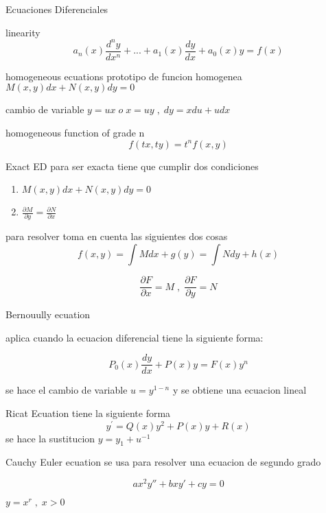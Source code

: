 \begin{section}{Ecuaciones Diferenciales}
	\begin{subsection}{linearity}
		$$ a_n(x) \frac{d^ny}{dx^n} + ... +  a_1(x) \frac{dy}{dx} + a_0(x)y = f(x)$$ 
	\end{subsection}
	\begin{subsection}{homogeneous ecuations}
		prototipo de funcion homogenea $M(x,y)dx + N(x,y)dy = 0$ 

		cambio de variable $y=ux \; o \; x=uy \; , \; dy=xdu + udx $
	
	\end{subsection}
	\begin{subsection}{homogeneous function of grade n}
		$$f(tx,ty) = t^nf(x,y)$$
	
	\end{subsection}
	\begin{subsection}{Exact ED}
		para ser exacta tiene que cumplir dos condiciones 
	\begin{enumerate}
		\item $M(x,y)dx + N(x,y)dy = 0$
		\item $\frac{\partial M}{\partial y} = \frac{\partial N }{\partial x}$
	\end{enumerate}
		para resolver toma en cuenta las siguientes dos cosas
		$$f(x,y) = \int M dx + g(y) = \int N dy + h(x) $$
	
	
		$$ \frac{ \partial F}{ \partial x} = M \; , \; \frac{ \partial F }{ \partial y} = N $$
	\end{subsection}
	\begin{subsection}{Bernouully ecuation}
	
		aplica cuando la ecuacion diferencial tiene la siguiente forma:
		
		$$P_0(x)\frac{dy}{dx} + P(x)y = F(x)y^n$$
		
		se hace el cambio de variable $u = y^{1-n}$ y se obtiene una ecuacion lineal
	
	
	\end{subsection}
	\begin{subsection}{Ricat Ecuation}
		 tiene la siguiente forma
		  $$y^{'} = Q(x)y^{2} + P(x)y + R(x)$$
		se hace la sustitucion $y=y_1 + u^{-1}$ 
	
	\end{subsection}

	\begin{subsection}{Cauchy Euler ecuation}
		se usa para resolver una ecuacion de segundo grado
	
	
		$$ax^2y'' + bxy' + cy = 0$$
		\begin{center}
		$y = x^r \;, \; x > 0 $
		\end{center}
	\end{subsection}
	

\end{section}
